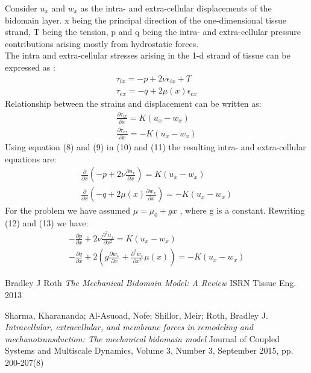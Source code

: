\documentclass[a4paper,oneside,11pt]{report}
\begin{document}
Consider $u_{x}$ and $w_{x}$ as the intra- and extra-cellular displacements of the bidomain layer. x being the principal direction of the one-dimensional tissue strand, T being the tension, p and q being the intra- and extra-cellular pressure contributions arising mostly from hydrostatic forces. \\

The intra and extra-cellular stresses arising in the 1-d strand of tissue can be expressed as \cite{roth2015}: 
\begin{align}
\tau_{ix} = -p + 2\nu\epsilon_{ix} + T \\
\tau_{ex} = -q + 2\mu(x)\epsilon_{ex}   
\end{align}
Relationship between the strains and displacement can be written as: 
\begin{align}
\frac{\partial\tau_{ix}}{\partial x} = K (u_x - w_x) \\
\frac{\partial\tau_{ex}}{\partial x} = - K (u_x - w_x) 
\end{align}
Using equation (8) and (9) in (10) and (11) the resulting intra- and extra-cellular equations are: 
\begin{align}
\frac{\partial}{\partial x}(-p + 2\nu\frac{\partial u_x}{\partial x}) = K (u_x - w_x) \\
\frac{\partial}{\partial x}(-q + 2\mu (x) \frac{\partial w_x}{\partial x}) = -K (u_x - w_x)
\end{align}
For the problem we have assumed $\mu = \mu_0 + gx$ , where g is a constant. Rewriting (12) and (13) we have:
\begin{align}
- \frac{\partial p}{\partial x} + 2\nu\frac{\partial^{2}u_x}{\partial x^2} = K (u_x - w_x) \\
- \frac{\partial q}{\partial x} + 2(g\frac{\partial w_x}{\partial x} + \frac{\partial^{2}w_x}{\partial x^2} \mu(x)) = -K(u_x - w_x)
\end{align}

\begin{thebibliography}{9}
	Bradley J Roth
	\textit{The Mechanical Bidomain Model: A Review}
	ISRN Tissue Eng. 2013
	
	 Sharma, Kharananda; Al-Asuoad, Nofe; Shillor, Meir; Roth, Bradley J.
	\textit{Intracellular, extracellular, and membrane forces in remodeling and mechanotransduction: The mechanical bidomain model}
	Journal of Coupled Systems and Multiscale Dynamics, Volume 3, Number 3, September 2015, pp. 200-207(8)
\end{thebibliography}
\end{document}
